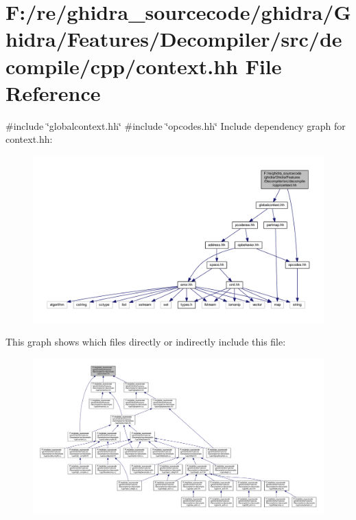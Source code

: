 \hypertarget{context_8hh}{}\section{F\+:/re/ghidra\+\_\+sourcecode/ghidra/\+Ghidra/\+Features/\+Decompiler/src/decompile/cpp/context.hh File Reference}
\label{context_8hh}
{\ttfamily \#include \char`\"{}globalcontext.\+hh\char`\"{}}\newline
{\ttfamily \#include \char`\"{}opcodes.\+hh\char`\"{}}\newline
Include dependency graph for context.\+hh\+:
\nopagebreak
\begin{figure}[H]
\begin{center}
\leavevmode
\includegraphics[width=350pt]{context_8hh__incl}
\end{center}
\end{figure}
This graph shows which files directly or indirectly include this file\+:
\nopagebreak
\begin{figure}[H]
\begin{center}
\leavevmode
\includegraphics[width=350pt]{context_8hh__dep__incl}
\end{center}
\end{figure}
